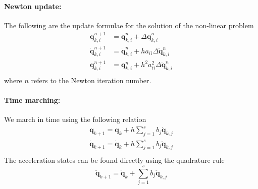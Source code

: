 \documentclass[pdftex,11pt,letter]{article}
\begin{document}
\begin{multicols}{2}
\paragraph{Newton update:}
The following are the update formulae for the solution of the non-linear problem
\begin{equation}\label{newton_update2}
  \begin{split}
    \mathbf{\ddot{q}}_{k,i}^{n+1} & = \mathbf{\ddot{q}}_{k,i}^{n} +
    \Delta\mathbf{\ddot{q}}_{k,i}^{n} \\
    \mathbf{\dot{q}}_{k,i}^{n+1} & = \mathbf{\dot{q}}_{k,i}^n + h a_{ii}
    \Delta\mathbf{\ddot{q}}_{k,i}^n \\
    \mathbf{{q}}_{k,i}^{n+1} & = \mathbf{{q}}_{k,i}^n + h^2 a_{ii}^2
    \Delta\mathbf{\ddot{q}}_{k,i}^n \\
  \end{split}
\end{equation}
where $n$ refers to the Newton iteration number.

\paragraph{Time marching:}
We march in time using the following relation
\begin{equation}
  \begin{split}
  \mathbf{q}_{k+1} = \mathbf{q}_{k} +h \sum_{j=1}^s b_j \mathbf{\dot{q}}_{k,j} \\
  \mathbf{\dot{q}}_{k+1} = \mathbf{\dot{q}}_{k} +h \sum_{j=1}^s b_j \mathbf{\ddot{q}}_{k,j} \\
  \end{split}
\end{equation}
The acceleration states can be found directly using the quadrature rule
\begin{equation}
  \mathbf{\ddot{q}}_{k+1} = \mathbf{\ddot{q}}_{k} + \sum_{j=1}^s b_j \mathbf{\ddot{q}}_{k,j}
\end{equation}

\end{multicols}
\end{document}
